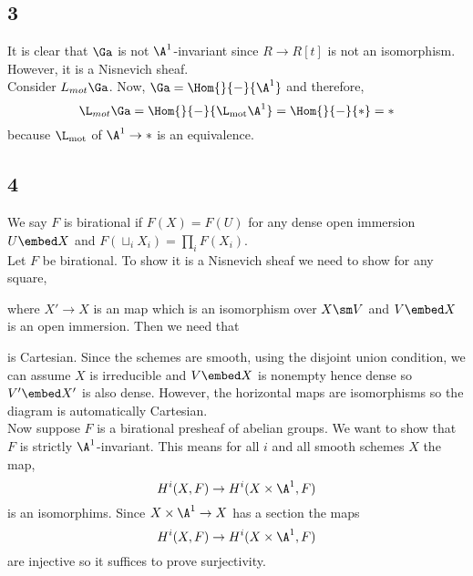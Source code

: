 \documentclass{article}
\begin{document}
\subsection{3}

It is clear that $\Ga$ is not $\A^1$-invariant since $R \to R[t]$ is not an isomorphism. However, it is a Nisnevich sheaf.
\bigskip\\
Consider $L_{mot} \Ga$. Now, $\Ga = \Hom{}{-}{\A^1}$ and therefore,
\[ \L_{mot} \Ga = \Hom{}{-}{\L_{\mot} \A^1} = \Hom{}{-}{*} = * \]
because $\L_{\mot}$ of $\A^1 \to *$ is an equivalence. 

\subsection{4}

We say $F$ is birational if $F(X) = F(U)$ for any dense open immersion $U \embed X$ and $F(\sqcup_i X_i) = \prod_i F(X_i)$.
\bigskip\\
Let $F$ be birational. To show it is a Nisnevich sheaf we need to show for any square,
\begin{center}
\end{center}
where $X' \to X$ is an \etale map which is an isomorphism over $X \sm V$ and $V \embed X$ is an open immersion. Then we need that
\begin{center}
\end{center}
is Cartesian. Since the schemes are smooth, using the disjoint union condition, we can assume $X$ is irreducible and $V \embed X$ is nonempty hence dense so $V' \embed X'$ is also dense. However, the horizontal maps are isomorphisms so the diagram is automatically Cartesian. 
\bigskip\\
Now suppose $F$ is a birational presheaf of abelian groups. We want to show that $F$ is strictly $\A^1$-invariant. This means for all $i$ and all smooth schemes $X$ the map,
\[ H^i(X, F) \to H^i(X \times \A^1, F) \]
is an isomorphims. Since $X \times \A^1 \to X$ has a section the maps
\[ H^i(X, F) \to H^i(X \times \A^1, F) \]
are injective so it suffices to prove surjectivity.
\end{document}

